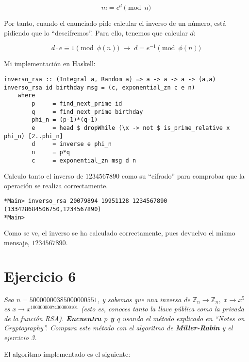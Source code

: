 \documentclass[10pt,spanish]{article}
\begin{document}
\begin{displaymath}
    m = c^d \pmod n
\end{displaymath}

Por tanto, cuando el enunciado pide calcular el inverso de un número, está pidiendo que lo ``descifremos''. Para ello, tenemos que calcular $d$:

\begin{displaymath}
    d \cdot e \equiv 1 \pmod{\phi (n)} \; \longrightarrow \; d = e^{-1} \pmod{\phi (n)}
\end{displaymath}

Mi implementación en Haskell:

\begin{verbatim}
inverso_rsa :: (Integral a, Random a) => a -> a -> a -> (a,a)
inverso_rsa id birthday msg = (c, exponential_zn c e n)
    where
        p     = find_next_prime id
        q     = find_next_prime birthday
        phi_n = (p-1)*(q-1)
        e     = head $ dropWhile (\x -> not $ is_prime_relative x phi_n) [2..phi_n]
        d     = inverse e phi_n
        n     = p*q
        c     = exponential_zn msg d n
\end{verbatim}

Calculo tanto el inverso de $1234567890$ como su ``cifrado'' para comprobar que la operación se realiza correctamente.

\begin{verbatim}
*Main> inverso_rsa 20079894 19951128 1234567890
(133428684506750,1234567890)
*Main> 
\end{verbatim}

Como se ve, el inverso se ha calculado correctamente, pues devuelvo el mismo mensaje, $1234567890$.

\section{\textcolor{azul}Ejercicio 6}
\textit{Sea $n=50000000385000000551$, y sabemos que una inversa de $\mathbb{Z}_n \rightarrow \mathbb{Z}_n, \; x \rightarrow x^5$ es $x \rightarrow x^{10000000074000000101}$ (esto es, conoces tanto la llave pública como la privada de la función RSA). \textbf{\textcolor{azul}{Encuentra $p$ y $q$}} usando el método explicado en ``Notes on Cryptography''. Compara este método con el algoritmo de \textbf{\textcolor{azul}{Miller-Rabin}} y el ejercicio 3.}

El algoritmo implementado es el siguiente:
\end{document}
